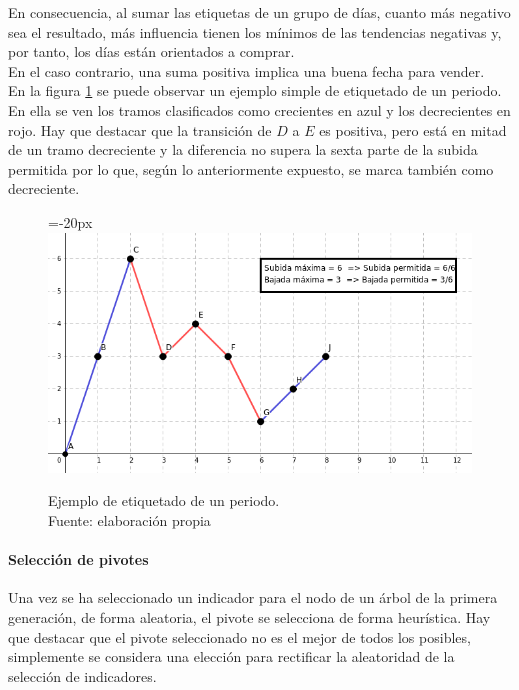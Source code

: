     En consecuencia, al sumar las etiquetas de un grupo de d\'ias, cuanto m\'as negativo sea el resultado, m\'as influencia tienen los m\'inimos de las tendencias negativas y, por tanto, los d\'ias est\'an orientados a comprar.\\
    
    En el caso contrario, una suma positiva implica una buena fecha para vender.\\
    
    En la figura \ref{fig:tagging} se puede observar un ejemplo simple de etiquetado de un periodo. En ella se ven los tramos clasificados como crecientes en azul y los decrecientes en rojo. Hay que destacar que la transici\'on de $D$ a $E$ es positiva, pero est\'a en mitad de un tramo decreciente y la diferencia no supera la sexta parte de la subida permitida por lo que, seg\'un lo anteriormente expuesto, se marca tambi\'en como decreciente.\\
    
     	\begin{figure}[H]
    		\centering\leftskip=-20px
    		\includegraphics[scale=0.65]{imagenes/tagging.png}
    	    \caption[Ejemplo de etiquetado de un periodo]{Ejemplo de etiquetado de un periodo.\\ Fuente: elaboraci\'on propia}
    		\label{fig:tagging}
	   \end{figure}
    
\paragraph{Selecci\'on de pivotes}
Una vez se ha seleccionado un indicador para el nodo de un \'arbol de la primera generaci\'on, de forma aleatoria, el pivote se selecciona de forma heur\'istica. Hay que destacar que el pivote seleccionado no es el mejor de todos los posibles, simplemente se considera una elecci\'on para rectificar la aleatoridad de la selecci\'on de indicadores.\\


